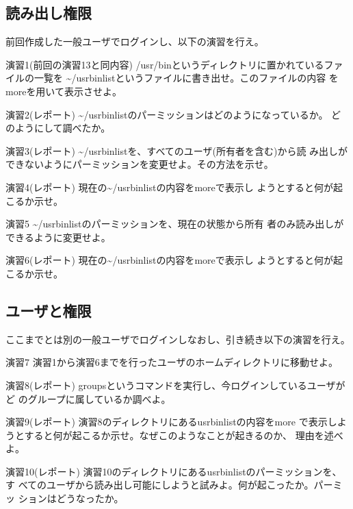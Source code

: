 \documentclass[a4j,10pt]{jarticle}
\begin{document}
\subsection{読み出し権限}
前回作成した一般ユーザでログインし、以下の演習を行え。
\begin{itembox}{演習1(前回の演習13と同内容)}
 {\sffamily /usr/bin}というディレクトリに置かれているファイルの一覧を
 {\sffamily \~{}/usrbinlist}というファイルに書き出せ。このファイルの内容
 を{\sffamily more}を用いて表示させよ。
\end{itembox}
\begin{itembox}{演習2(レポート)}
 {\sffamily \~{}{\slash}usrbinlist}のパーミッションはどのようになっているか。
 どのようにして調べたか。
\end{itembox}
\begin{itembox}{演習3(レポート)}
 {\sffamily \~{}{\slash}usrbinlist}を、すべてのユーザ(所有者を含む)から読
 み出しができないようにパーミッションを変更せよ。その方法を示せ。
\end{itembox}
\begin{itembox}{演習4(レポート)}
 現在の{\sffamily \~{}{\slash}usrbinlist}の内容を{\sffamily more}で表示し
 ようとすると何が起こるか示せ。
\end{itembox}
\begin{itembox}{演習5}
 {\sffamily \~{}{\slash}usrbinlist}のパーミッションを、現在の状態から所有
 者のみ読み出しができるように変更せよ。
\end{itembox}
\begin{itembox}{演習6(レポート)}
 現在の{\sffamily \~{}{\slash}usrbinlist}の内容を{\sffamily more}で表示し
 ようとすると何が起こるか示せ。
\end{itembox}

\subsection{ユーザと権限}
ここまでとは別の一般ユーザでログインしなおし、引き続き以下の演習を行え。
\begin{itembox}{演習7}
 演習1から演習6までを行ったユーザのホームディレクトリに移動せよ。
\end{itembox}
\begin{itembox}{演習8(レポート)}
 {\sffamily groups}というコマンドを実行し、今ログインしているユーザがど
 のグループに属しているか調べよ。
\end{itembox}
\begin{itembox}{演習9(レポート)}
 演習8のディレクトリにある{\sffamily usrbinlist}の内容を{\sffamily more} 
 で表示しようとすると何が起こるか示せ。なぜこのようなことが起きるのか、
 理由を述べよ。
\end{itembox}
\begin{itembox}{演習10(レポート)}
 演習10のディレクトリにある{\sffamily usrbinlist}のパーミッションを、す
 べてのユーザから読み出し可能にしようと試みよ。何が起こったか。パーミッ
 ションはどうなったか。
\end{itembox}
\end{document}
